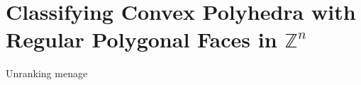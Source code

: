 \chapter{Classifying Convex Polyhedra with Regular Polygonal Faces in \texorpdfstring{$\mathbb Z^n$}{Z}}
\label{cha:ClassifyingPolyhedra}
Unranking menage
\paragraph{}
\Blindtext[2]
